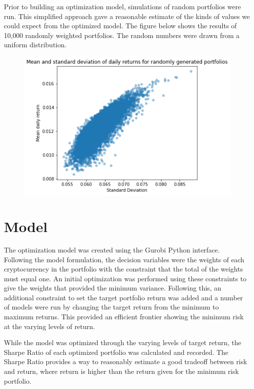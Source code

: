 \documentclass[11pt]{article} %
\begin{document}
Prior to building an optimization model, simulations of random portfolios were run. This simplified approach gave a reasonable estimate of the kinds of values we could expect from the optimized model. The figure below shows the results of 10,000 randomly weighted portfolios. The random numbers were drawn from a uniform distribution.


\begin{figure}[h]
\includegraphics{sim1}
\centering
\end{figure}
 
\section{Model}

The optimization model was created using the Gurobi Python interface. Following the model formulation, the decision variables were the weights of each cryptocurrency in the portfolio with the constraint that the total of the weights must equal one. An initial optimization was performed using these constraints to give the weights that provided the minimum variance. Following this, an additional constraint to set the target portfolio return was added and a number of models were run by changing the target return from the minimum to maximum returns. This provided an efficient frontier showing the minimum risk at the varying levels of return.

While the model was optimized through the varying levels of target return, the Sharpe Ratio of each optimized portfolio was calculated and recorded. The Sharpe Ratio provides a way to reasonably estimate a good tradeoff between risk and return, where return is higher than the return given for the minimum risk portfolio. 
\end{document}
